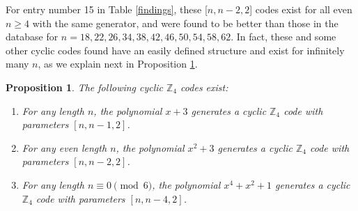 \documentclass[a4paper, 12pt]{amsart}
\newtheorem{proposition}[lemma]{Proposition}
\theoremstyle{definition}
\newtheorem{example}[lemma]{Example}
\newcommand{\Z}{{\mathbb Z}}
\numberwithin{equation}{section}
\numberwithin{table}{section}
\begin{document}



For entry number 15 in Table \ref{findings}, these [$n,n-2,2$] codes exist for all even $n\geq 4$ with the same generator, and were found to be better than those in the database for $n = 18,22,26, 34, 38, 42, 46,50, 54, 58, 62$. In fact, these and some other cyclic codes found have an easily defined structure and exist for infinitely many $n$, as we explain next in Proposition \ref{cyclicexplained}.



\begin{proposition}\label{cyclicexplained}
    The following cyclic $\Z_4$ codes exist:

    \begin{enumerate}
    \item For any length $n$, the polynomial $x+3$ generates a cyclic $\Z_4$ code with parameters $[n,n-1,2]$.

    \item For any even length $n$, the polynomial $x^2+3$ generates a cyclic $\Z_4$ code with parameters $[n,n-2,2]$.

    \item For any length $n \equiv 0 \pmod 6$, the polynomial $x^4+x^2+1$ generates a cyclic $\Z_4$ code with parameters $[n,n-4,2]$.
    \end{enumerate}
\end{proposition}
\end{document}
